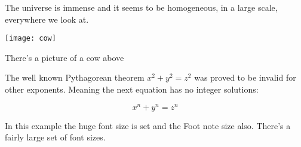 \documentclass{article}
\begin{document}
The universe is immense and it seems to be homogeneous,
in a large scale, everywhere we look at.

\texttt{[image: cow]}

There's a picture of a cow above

The well known Pythagorean theorem \(x^2 + y^2 = z^2\) was
proved to be invalid for other exponents.
Meaning the next equation has no integer solutions:

\[ x^n + y^n = z^n \]

In this example the {\huge huge font size} is set and
the {\footnotesize Foot note size also}. There's a fairly
large set of font sizes.
\end{document}
